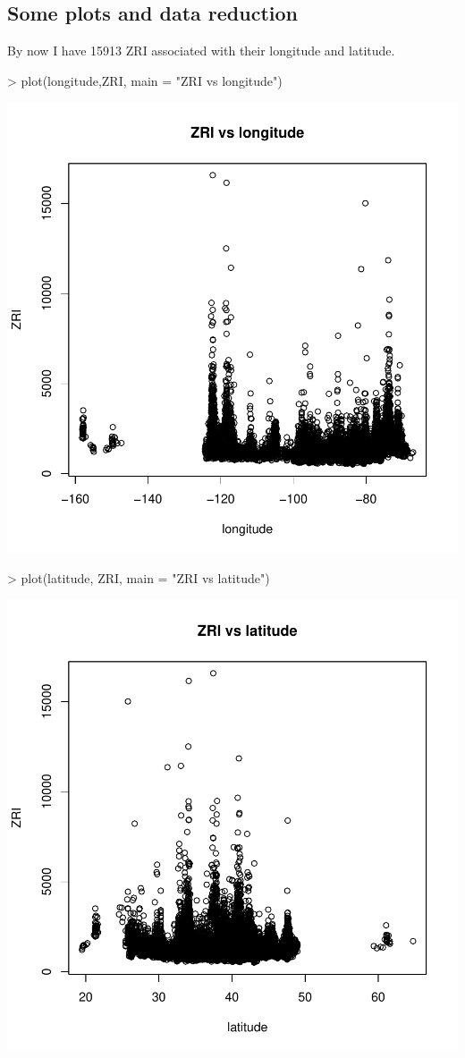 \documentclass[a4paper]{article}
\begin{document}
\subsection{Some plots and data reduction}
By now I have 15913 ZRI associated with their longitude and latitude.
\begin{Schunk}
\begin{Sinput}
> plot(longitude,ZRI, main = "ZRI vs longitude")
\end{Sinput}
\end{Schunk}
\includegraphics{project_tex-test1}
\begin{Schunk}
\begin{Sinput}
> plot(latitude, ZRI, main = "ZRI vs latitude")
\end{Sinput}
\end{Schunk}
\includegraphics{project_tex-test2}
\end{document}
